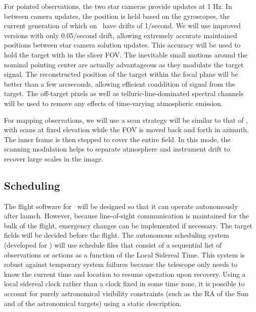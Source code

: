 For pointed observations, the two star cameras provide updates at 1 Hz.  In between camera updates, the position is held based on the gyroscopes, the current generation of which on \blast\ have drifts of 1\arcsec/second.  We will use improved versions with only 0.05\arcsec/second drift, allowing extremely accurate maintained positions between star camera solution updates.  This accuracy will be used to hold the target with in the slicer FOV.  The inevitable small motions around the nominal pointing center are actually advantageous as they modulate the target signal.  The reconstructed position of the target within the focal plane will be better than a few arcseconds, allowing efficient coaddition of signal from the target.  The off-target pixels as well as telluric-line-dominated spectral channels will be used to remove any effects of time-varying atmospheric emission.

For mapping observations, we will use a scan strategy will be similar to that of \blast, with scans at fixed elevation while the FOV is moved back and forth in
azimuth.  The inner frame is then stepped to cover the entire field.
In this mode, the scanning modulation helps to separate atmosphere and instrument drift to recover large scales in the image.

\subsection{Scheduling}

The flight software for \name\ will be designed so that it can operate
autonomously after launch.  However, because line-of-sight communication is maintained for the bulk of the flight, emergency changes can be implemented if necessary. The target fields
will be decided before the flight.  The autonomous scheduling system
(developed for \blast) will use schedule files that consist of a
sequential list of observations or actions as a function of the Local
Sidereal Time.  This system is robust against temporary system
failures because the telescope only needs to know the current time and
location to resume operation upon recovery.  Using a local sidereal
clock rather than a clock fixed in some time zone, it is possible to
account for purely astronomical visibility constraints (such as the RA
of the Sun and of the astronomical targets) using a static
description.

